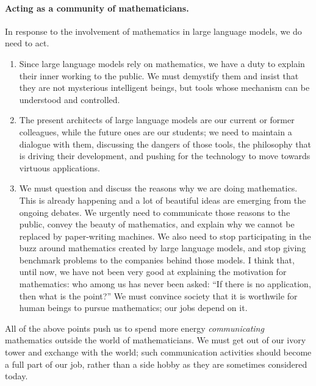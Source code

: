 \documentclass[a4paper,12pt]{article}
\begin{document}
	\paragraph{Acting as a community of mathematicians.}
	In response to the involvement of mathematics in large language models, we do need to act.
	\begin{enumerate}
		\item Since large language models rely on mathematics, we have a duty to explain their inner working to the public.
		We must demystify them and insist that they are not mysterious intelligent beings, but tools whose mechanism can be understood and controlled.
		\item The present architects of large language models are our current or former colleagues, while the future ones are our students; we need to maintain a dialogue with them, discussing the dangers of those tools, the philosophy that is driving their development, and pushing for the technology to move towards virtuous applications.
		\item We must question and discuss the reasons why we are doing mathematics.
		This is already happening and a lot of beautiful ideas are emerging from the ongoing debates.
		We urgently need to communicate those reasons to the public, convey the beauty of mathematics, and explain why we cannot be replaced by paper-writing machines.
		We also need to stop participating in the buzz around mathematics created by large language models, and stop giving benchmark problems to the companies behind those models.
		I think that, until now, we have not been very good at explaining the motivation for mathematics: who among us has never been asked: ``If there is no application, then what is the point?''
		We must convince society that it is worthwile for human beings to pursue mathematics; our jobs depend on it.
	\end{enumerate}
	All of the above points push us to spend more energy \emph{communicating} mathematics outside the world of mathematicians.
	We must get out of our ivory tower and exchange with the world; such communication activities should become a full part of our job, rather than a side hobby as they are sometimes considered today.
	
\end{document}
